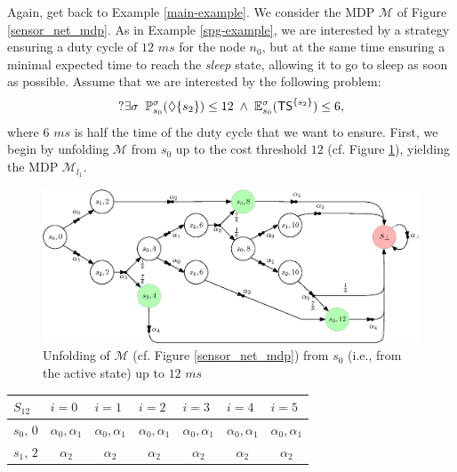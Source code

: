 \begin{example}
  Again, get back to Example \ref{main-example}.
  We consider the MDP $\mathcal{M}$ of Figure \ref{sensor_net_mdp}. As in Example \ref{spg-example}, we are interested by a strategy ensuring a duty cycle of $12$ $ms$ for the node $n_0$, but at the same time ensuring a minimal expected time to reach the \textit{sleep} state, allowing it to go to sleep as soon as possible.
  Assume that we are interested by the following \SSPWE{} problem:
  \[
    ?\exists \sigma \; \;  \mathbb{P}^\sigma_{s_0}(\Diamond \{s_2\}) \leq 12 \; \wedge \; \mathbb{E}^\sigma_{s_0}(\text{\sffamily TS}^{\{s_2\}}) \leq 6,
  \]
  where $6$ $ms$ is half the time of the duty cycle that we want to ensure. First, we begin by unfolding $\mathcal{M}$ from $s_0$ up to the cost threshold $12$ (cf. Figure \ref{unfolding-sspwe}), yielding the MDP $\mathcal{M}_{l_1}$.
  \begin{figure}[h]
    \centering
    \includegraphics[width=0.9\linewidth]{resources/main-example-unfolding}
    \captionsetup{justification=centering}
    \caption{Unfolding of $\mathcal{M}$ (cf. Figure \ref{sensor_net_mdp}) from $s_0$ (i.e., from the active state) up to $12$ $ms$}
    \label{unfolding-sspwe}
  \end{figure}
  \begin{table}[h]
  \centering
\begin{tabular}{l|cccccc}
$S_{12}$          & \multicolumn{1}{l}{$i=0$} & \multicolumn{1}{l}{$i=1$}                                  & \multicolumn{1}{l}{$i=2$}  & \multicolumn{1}{l}{$i=3$}  & \multicolumn{1}{l}{$i=4$} & \multicolumn{1}{l}{$i=5$} \\ \hline
$s_0, \, 0$  & $\alpha_0, \alpha_1$      & $\alpha_0, \alpha_1$                                       & $\alpha_0, \alpha_1$       & $\alpha_0, \alpha_1$       & $\alpha_0, \alpha_1$      & $\alpha_0, \alpha_1$      \\
$s_1, \, 2$  & $\alpha_2$                & $\alpha_2$                                                 & $\alpha_2$                 & $\alpha_2$                 & $\alpha_2$                & $\alpha_2$                \\

\end{tabular}
\end{table}
\end{example}

